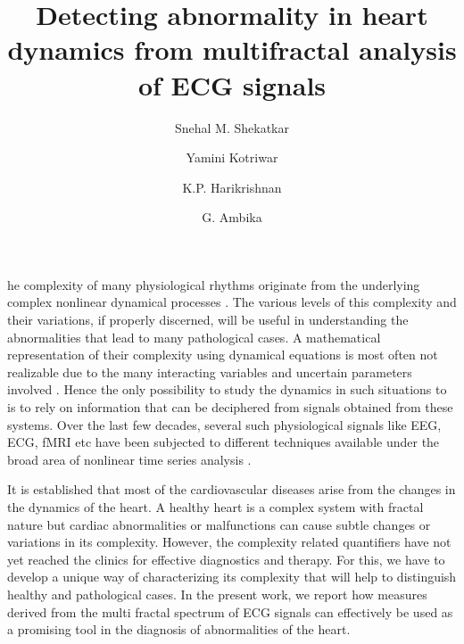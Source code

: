 \documentclass[9pt,twocolumn,twoside]{pnas-new}
\title{Detecting abnormality in heart dynamics from multifractal analysis of ECG signals}
\author[a]{Snehal M. Shekatkar}
\author[a]{Yamini Kotriwar}
\author[b]{K.P. Harikrishnan}
\author[a,1]{G. Ambika}
\affil[a]{Indian Institute of Science Education and Research, Pune-411008, India}
\affil[b]{Department of Physics, The Cochin College, Cochin-682002, India}
\begin{document}
\verticaladjustment{-2pt}

\maketitle
\thispagestyle{firststyle}


he complexity of many physiological rhythms originate from the underlying complex nonlinear dynamical processes \cite{lewis1975phase, glass2001synchronization, karma2013physics, pijn1991chaos, qu2014nonlinear, webber1994dynamical, muller2016causality}. The various levels of this complexity and their variations, if properly discerned, will be useful in understanding the abnormalities that lead to many pathological cases\cite{mendis2011global, world2014global, go2014heart}. A mathematical representation of their complexity using dynamical equations is most often not realizable due to the many interacting variables and uncertain parameters involved \cite{bruggeman2007nature, lillacci2010parameter}. Hence the only possibility to study the dynamics in such situations to is to rely on information that can be deciphered from signals obtained from these systems\cite{kantz2004nonlinear, lehnertz1998can, richman2000physiological}. Over the last few decades, several such physiological signals like EEG, ECG, fMRI etc have been subjected to different techniques available under the broad area of nonlinear time series analysis \cite{kurths1995quantitative, marwan2002recurrence, kantz2004nonlinear}.

It is established that most of the cardiovascular diseases arise from the changes in the dynamics of the heart. A healthy heart is a complex system with fractal nature \cite{ivanov1999multifractality, yang2007multifractal, glass2012theory} but cardiac abnormalities or malfunctions can cause subtle changes or variations in its complexity. However, the complexity related quantifiers have not yet reached the clinics for effective diagnostics and therapy. For this, we have to develop a unique way of characterizing its complexity that will help to distinguish healthy and pathological cases. In the present work, we report how measures derived from the multi fractal spectrum of ECG signals can effectively be used as a promising tool in the diagnosis of abnormalities of the heart. 
\end{document}
